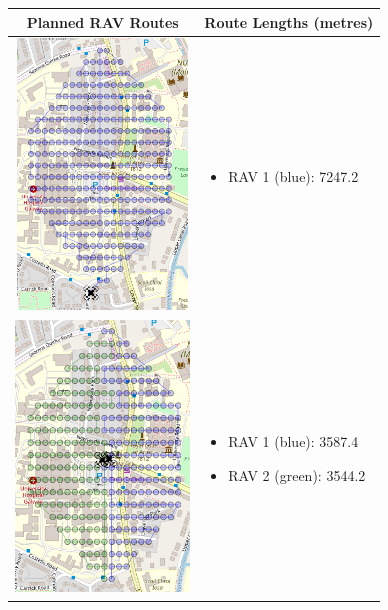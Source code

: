 \begin{table}[H]
  \centering
  \begin{tabular}{ | c | m{4.5cm} | }
    \hline
    Planned RAV Routes & Route Lengths (metres) \\
    \hline
    
    \begin{minipage}[c][74mm][c]{.5\textwidth}
      \includegraphics[width=\linewidth, height=72mm]{Chapters/MultiAgentCoverage/MultipleTravellingSalesman/Figs/Hexagon/OneRAV.PNG}
    \end{minipage}
    &
    \begin{itemize}[leftmargin=*]
      \item[] RAV 1 (blue): 7247.2
    \end{itemize}
    \\
    \hline
    \begin{minipage}[c][74mm][c]{.5\textwidth}
      \includegraphics[width=\linewidth, height=72mm]{Chapters/MultiAgentCoverage/MultipleTravellingSalesman/Figs/Hexagon/TwoRAV.PNG}
    \end{minipage}
    &
    \begin{itemize}[leftmargin=*]
        \item[] RAV 1 (blue): 3587.4
        \item[] RAV 2 (green): 3544.2
    \end{itemize}
    \\
    \hline
    

\end{tabular}
\end{table}
